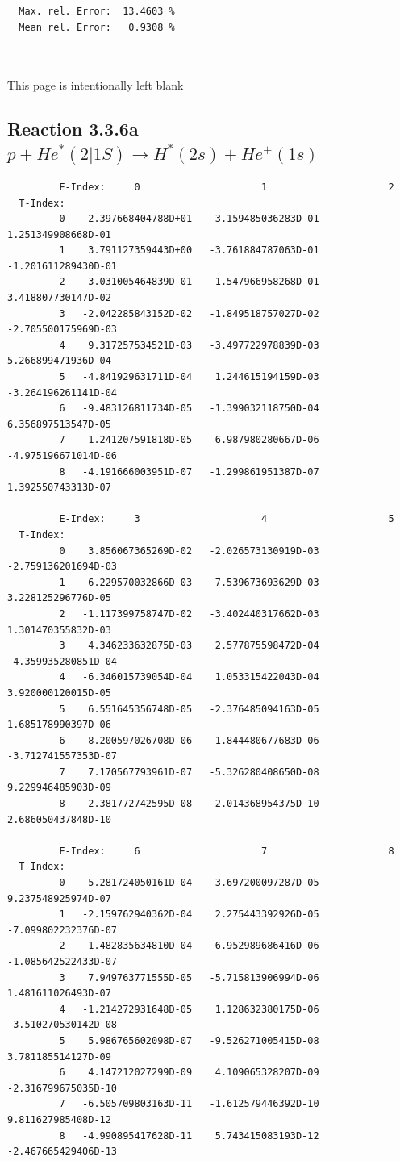 \documentclass[12pt,dvips]{article}
\begin{document}
\begin{small}
\begin{verbatim}
  Max. rel. Error:  13.4603 %
  Mean rel. Error:   0.9308 %



\end{verbatim}\end{small}

\newpage
This page is intentionally left blank
\newpage

\subsection{
Reaction 3.3.6a $   p + He^*(2|1S) \rightarrow H^*(2s) + He^+(1s) $
}


\begin{small}\begin{verbatim}
         E-Index:     0                     1                     2
  T-Index:
         0   -2.397668404788D+01    3.159485036283D-01    1.251349908668D-01
         1    3.791127359443D+00   -3.761884787063D-01   -1.201611289430D-01
         2   -3.031005464839D-01    1.547966958268D-01    3.418807730147D-02
         3   -2.042285843152D-02   -1.849518757027D-02   -2.705500175969D-03
         4    9.317257534521D-03   -3.497722978839D-03    5.266899471936D-04
         5   -4.841929631711D-04    1.244615194159D-03   -3.264196261141D-04
         6   -9.483126811734D-05   -1.399032118750D-04    6.356897513547D-05
         7    1.241207591818D-05    6.987980280667D-06   -4.975196671014D-06
         8   -4.191666003951D-07   -1.299861951387D-07    1.392550743313D-07

         E-Index:     3                     4                     5
  T-Index:
         0    3.856067365269D-02   -2.026573130919D-03   -2.759136201694D-03
         1   -6.229570032866D-03    7.539673693629D-03    3.228125296776D-05
         2   -1.117399758747D-02   -3.402440317662D-03    1.301470355832D-03
         3    4.346233632875D-03    2.577875598472D-04   -4.359935280851D-04
         4   -6.346015739054D-04    1.053315422043D-04    3.920000120015D-05
         5    6.551645356748D-05   -2.376485094163D-05    1.685178990397D-06
         6   -8.200597026708D-06    1.844480677683D-06   -3.712741557353D-07
         7    7.170567793961D-07   -5.326280408650D-08    9.229946485903D-09
         8   -2.381772742595D-08    2.014368954375D-10    2.686050437848D-10

         E-Index:     6                     7                     8
  T-Index:
         0    5.281724050161D-04   -3.697200097287D-05    9.237548925974D-07
         1   -2.159762940362D-04    2.275443392926D-05   -7.099802232376D-07
         2   -1.482835634810D-04    6.952989686416D-06   -1.085642522433D-07
         3    7.949763771555D-05   -5.715813906994D-06    1.481611026493D-07
         4   -1.214272931648D-05    1.128632380175D-06   -3.510270530142D-08
         5    5.986765602098D-07   -9.526271005415D-08    3.781185514127D-09
         6    4.147212027299D-09    4.109065328207D-09   -2.316799675035D-10
         7   -6.505709803163D-11   -1.612579446392D-10    9.811627985408D-12
         8   -4.990895417628D-11    5.743415083193D-12   -2.467665429406D-13


\end{verbatim}
\end{small}
\end{document}
